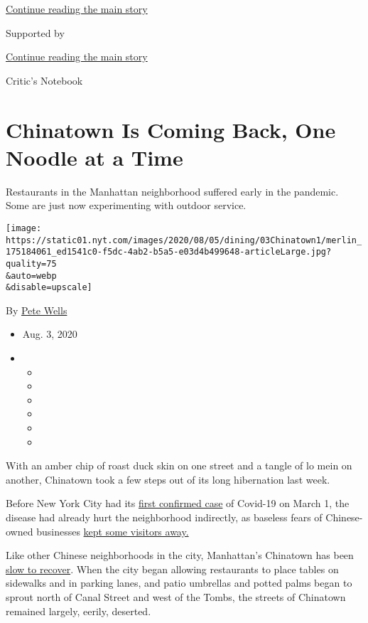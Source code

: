 \protect\hyperlink{after-top}{Continue reading the main story}

Supported by

\protect\hyperlink{after-sponsor}{Continue reading the main story}

Critic's Notebook

\hypertarget{chinatown-is-coming-back-one-noodle-at-a-time}{%
\section{Chinatown Is Coming Back, One Noodle at a
Time}\label{chinatown-is-coming-back-one-noodle-at-a-time}}

Restaurants in the Manhattan neighborhood suffered early in the
pandemic. Some are just now experimenting with outdoor service.

\texttt{[image: https://static01.nyt.com/images/2020/08/05/dining/03Chinatown1/merlin\_175184061\_ed1541c0-f5dc-4ab2-b5a5-e03d4b499648-articleLarge.jpg?quality=75\\\&auto=webp\\\&disable=upscale]}

By \href{https://www.nytimes.com/by/pete-wells}{Pete Wells}

\begin{itemize}
\item
  Aug. 3, 2020
\item
  \begin{itemize}
  \item
  \item
  \item
  \item
  \item
  \item
  \end{itemize}
\end{itemize}

With an amber chip of roast duck skin on one street and a tangle of lo
mein on another, Chinatown took a few steps out of its long hibernation
last week.

Before New York City had its
\href{https://www.nytimes.com/2020/03/01/nyregion/new-york-coronvirus-confirmed.html}{first
confirmed case} of Covid-19 on March 1, the disease had already hurt the
neighborhood indirectly, as baseless fears of Chinese-owned businesses
\href{https://www.nytimes.com/2020/01/29/nyregion/coronavirus-nyc.html}{kept
some visitors away.}

Like other Chinese neighborhoods in the city, Manhattan's Chinatown has
been
\href{https://www.nytimes.com/2020/06/30/nyregion/chinatown-coronavirus-nyc.html?searchResultPosition=1}{slow
to recover}. When the city began allowing restaurants to place tables on
sidewalks and in parking lanes, and patio umbrellas and potted palms
began to sprout north of Canal Street and west of the Tombs, the streets
of Chinatown remained largely, eerily, deserted.

